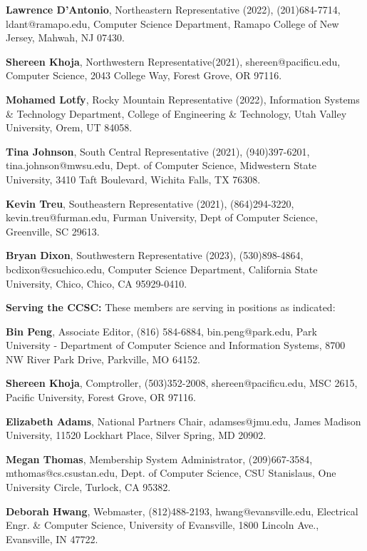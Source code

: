\documentclass{article}
\begin{document}
\begin{multicols}{2}
\begin{raggedright}
{\noindent
\textbf{Lawrence D'Antonio}, Northeastern Representative (2022), (201)684-7714,
ldant@ramapo.edu, Computer Science Department, Ramapo College of New Jersey,
Mahwah, NJ 07430.

\noindent
\textbf{Shereen Khoja},	Northwestern Representative(2021), shereen@pacificu.edu,
Computer Science, 2043 College Way, Forest Grove, OR 97116.

\noindent
\textbf{Mohamed Lotfy}, Rocky Mountain Representative (2022), Information Systems \& Technology Department,
College of Engineering \& Technology, Utah Valley University, Orem, UT 84058.

\noindent
\textbf{Tina Johnson}, South Central Representative (2021), (940)397-6201,
tina.johnson@mwsu.edu, Dept. of Computer Science, Midwestern State University,
3410 Taft Boulevard, Wichita Falls, TX 76308.

\noindent
\textbf{Kevin Treu}, Southeastern Representative (2021), (864)294-3220,
kevin.treu@furman.edu, Furman University, Dept of Computer Science, Greenville,
SC 29613.

\noindent
\textbf{Bryan Dixon}, Southwestern Representative (2023), (530)898-4864,
bcdixon@csuchico.edu, Computer Science Department, California State University,
Chico, Chico, CA 95929-0410.

\vspace{0.2in}
\noindent
\textbf{Serving the CCSC:} These members are serving in positions as indicated:

\noindent
\textbf{Bin Peng}, Associate Editor, (816) 584-6884,
bin.peng@park.edu, Park University - Department of Computer Science and
Information Systems, 8700 NW River Park Drive, Parkville, MO 64152.

\noindent
\textbf{Shereen Khoja}, Comptroller, (503)352-2008, shereen@pacificu.edu,
MSC 2615, Pacific University, Forest Grove, OR 97116.

\noindent
\textbf{Elizabeth Adams}, National Partners Chair, adamses@jmu.edu,
James Madison University, 11520 Lockhart Place, Silver Spring, MD 20902.

\noindent
\textbf{Megan Thomas}, Membership System Administrator, (209)667-3584,
mthomas@cs.csustan.edu, Dept. of Computer Science, CSU Stanislaus,
One University Circle, Turlock, CA 95382.

\noindent
\textbf{Deborah Hwang}, Webmaster, (812)488-2193, hwang@evansville.edu,
Electrical Engr. \& Computer Science, University of Evansville,
1800 Lincoln Ave., Evansville, IN 47722.

}

\end{raggedright}
\end{multicols}
\end{document}

